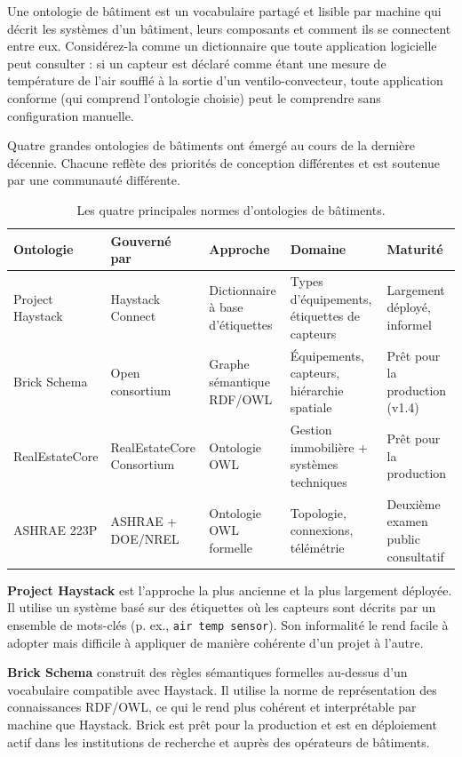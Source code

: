 Une ontologie de bâtiment est un vocabulaire partagé et lisible par machine qui décrit les systèmes d'un bâtiment, leurs composants et comment ils se connectent entre eux.
Considérez-la comme un dictionnaire que toute application logicielle peut consulter : si un capteur est déclaré comme étant une mesure de température de l'air soufflé à la sortie d'un ventilo-convecteur, toute application conforme (qui comprend l'ontologie choisie) peut le comprendre sans configuration manuelle.

Quatre grandes ontologies de bâtiments ont émergé au cours de la dernière décennie.
Chacune reflète des priorités de conception différentes et est soutenue par une communauté différente.

\begin{table}[htbp]
\centering
\caption{Les quatre principales normes d'ontologies de bâtiments.}
\label{tab:ontologies}
\small
\begin{tabularx}{\textwidth}{l X X X X}
\toprule
\textbf{Ontologie} & \textbf{Gouverné par} & \textbf{Approche} & \textbf{Domaine} & \textbf{Maturité} \\
\midrule
Project Haystack & Haystack Connect & Dictionnaire à base d'étiquettes & Types d'équipements, étiquettes de capteurs & Largement déployé, informel \\
Brick Schema & Open consortium & Graphe sémantique RDF/OWL & Équipements, capteurs, hiérarchie spatiale & Prêt pour la production (v1.4) \\
RealEstateCore & RealEstateCore Consortium & Ontologie OWL & Gestion immobilière + systèmes techniques & Prêt pour la production \\
ASHRAE 223P & ASHRAE + DOE/NREL & Ontologie OWL formelle & Topologie, connexions, télémétrie & Deuxième examen public consultatif \\
\bottomrule
\end{tabularx}
\end{table}

\textbf{Project Haystack} est l'approche la plus ancienne et la plus largement déployée.
Il utilise un système basé sur des étiquettes où les capteurs sont décrits par un ensemble de mots-clés (p. ex., \texttt{air temp sensor}).
Son informalité le rend facile à adopter mais difficile à appliquer de manière cohérente d'un projet à l'autre.

\textbf{Brick Schema} construit des règles sémantiques formelles au-dessus d'un vocabulaire compatible avec Haystack.
Il utilise la norme de représentation des connaissances RDF/OWL, ce qui le rend plus cohérent et interprétable par machine que Haystack.
Brick est prêt pour la production et est en déploiement actif dans les institutions de recherche et auprès des opérateurs de bâtiments.

